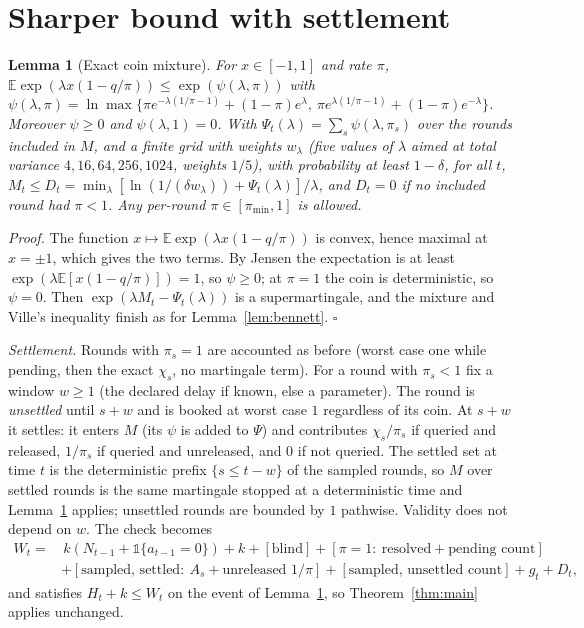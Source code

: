 \documentclass{article}
\theoremstyle{plain}
\newtheorem{lemma}{Lemma}
\theoremstyle{definition}
\newcommand{\E}{\mathbb{E}}
\newcommand{\one}{\mathbb{1}}
\begin{document}
\section{Sharper bound with settlement}\label{app:v2}
\begin{lemma}[Exact coin mixture]\label{lem:coin}
For $x\in[-1,1]$ and rate $\pi$, $\E\exp(\lambda x(1-q/\pi))\le\exp(\psi(\lambda,\pi))$ with $\psi(\lambda,\pi)=\ln\max\{\pi e^{-\lambda(1/\pi-1)}+(1-\pi)e^{\lambda},\ \pi e^{\lambda(1/\pi-1)}+(1-\pi)e^{-\lambda}\}$. Moreover $\psi\ge0$ and $\psi(\lambda,1)=0$. With $\Psi_t(\lambda)=\sum_s\psi(\lambda,\pi_s)$ over the rounds included in $M$, and a finite grid with weights $w_\lambda$ (five values of $\lambda$ aimed at total variance $4,16,64,256,1024$, weights $1/5$), with probability at least $1-\delta$, for all $t$, $M_t\le D_t=\min_\lambda[\ln(1/(\delta w_\lambda))+\Psi_t(\lambda)]/\lambda$, and $D_t=0$ if no included round had $\pi<1$. Any per-round $\pi\in[\pi_{\min},1]$ is allowed.
\end{lemma}
\emph{Proof.} The function $x\mapsto\E\exp(\lambda x(1-q/\pi))$ is convex, hence maximal at $x=\pm1$, which gives the two terms. By Jensen the expectation is at least $\exp(\lambda\E[x(1-q/\pi)])=1$, so $\psi\ge0$; at $\pi=1$ the coin is deterministic, so $\psi=0$. Then $\exp(\lambda M_t-\Psi_t(\lambda))$ is a supermartingale, and the mixture and Ville's inequality finish as for Lemma~\ref{lem:bennett}. $\square$

\emph{Settlement.} Rounds with $\pi_s=1$ are accounted as before (worst case one while pending, then the exact $\chi_s$, no martingale term). For a round with $\pi_s<1$ fix a window $w\ge1$ (the declared delay if known, else a parameter). The round is \emph{unsettled} until $s+w$ and is booked at worst case $1$ regardless of its coin. At $s+w$ it settles: it enters $M$ (its $\psi$ is added to $\Psi$) and contributes $\chi_s/\pi_s$ if queried and released, $1/\pi_s$ if queried and unreleased, and $0$ if not queried. The settled set at time $t$ is the deterministic prefix $\{s\le t-w\}$ of the sampled rounds, so $M$ over settled rounds is the same martingale stopped at a deterministic time and Lemma~\ref{lem:coin} applies; unsettled rounds are bounded by $1$ pathwise. Validity does not depend on $w$. The check becomes
\begin{align*}
W_t=&\,k(N_{t-1}+\one\{a_{t-1}=0\})+k+[\text{blind}]+[\pi=1:\ \text{resolved}+\text{pending count}]\\
&+[\text{sampled, settled}:\ A_s+\text{unreleased }1/\pi]+[\text{sampled, unsettled count}]+g_t+D_t,
\end{align*}
and satisfies $H_t+k\le W_t$ on the event of Lemma~\ref{lem:coin}, so Theorem~\ref{thm:main} applies unchanged.
\end{document}
